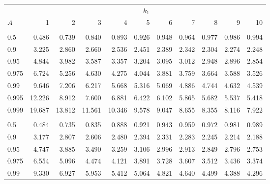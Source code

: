 \documentclass[
]{article}
\begin{document}
\begin{table}[H]
\centering
\begin{tabular}{lrrrrrrrrrr}
\toprule
\multicolumn{1}{c}{ } & \multicolumn{10}{c}{$k_1$} \\
\cmidrule(l{3pt}r{3pt}){2-11}
\hspace{1.1em}$A$ & 1 & 2 & 3 & 4 & 5 & 6 & 7 & 8 & 9 & 10\\
\midrule
\addlinespace[0.3em]
\multicolumn{11}{l}{\textbf{$k_2=11$}}\\
\hspace{1em}0.5 & 0.486 & 0.739 & 0.840 & 0.893 & 0.926 & 0.948 & 0.964 & 0.977 & 0.986 & 0.994\\
\hspace{1em}0.9 & 3.225 & 2.860 & 2.660 & 2.536 & 2.451 & 2.389 & 2.342 & 2.304 & 2.274 & 2.248\\
\hspace{1em}0.95 & 4.844 & 3.982 & 3.587 & 3.357 & 3.204 & 3.095 & 3.012 & 2.948 & 2.896 & 2.854\\
\hspace{1em}0.975 & 6.724 & 5.256 & 4.630 & 4.275 & 4.044 & 3.881 & 3.759 & 3.664 & 3.588 & 3.526\\
\hspace{1em}0.99 & 9.646 & 7.206 & 6.217 & 5.668 & 5.316 & 5.069 & 4.886 & 4.744 & 4.632 & 4.539\\
\hspace{1em}0.995 & 12.226 & 8.912 & 7.600 & 6.881 & 6.422 & 6.102 & 5.865 & 5.682 & 5.537 & 5.418\\
\hspace{1em}0.999 & 19.687 & 13.812 & 11.561 & 10.346 & 9.578 & 9.047 & 8.655 & 8.355 & 8.116 & 7.922\\
\addlinespace[0.3em]
\multicolumn{11}{l}{\textbf{$k_2=12$}}\\
\hspace{1em}0.5 & 0.484 & 0.735 & 0.835 & 0.888 & 0.921 & 0.943 & 0.959 & 0.972 & 0.981 & 0.989\\
\hspace{1em}0.9 & 3.177 & 2.807 & 2.606 & 2.480 & 2.394 & 2.331 & 2.283 & 2.245 & 2.214 & 2.188\\
\hspace{1em}0.95 & 4.747 & 3.885 & 3.490 & 3.259 & 3.106 & 2.996 & 2.913 & 2.849 & 2.796 & 2.753\\
\hspace{1em}0.975 & 6.554 & 5.096 & 4.474 & 4.121 & 3.891 & 3.728 & 3.607 & 3.512 & 3.436 & 3.374\\
\hspace{1em}0.99 & 9.330 & 6.927 & 5.953 & 5.412 & 5.064 & 4.821 & 4.640 & 4.499 & 4.388 & 4.296\\

\end{tabular}
\end{table}
\end{document}
